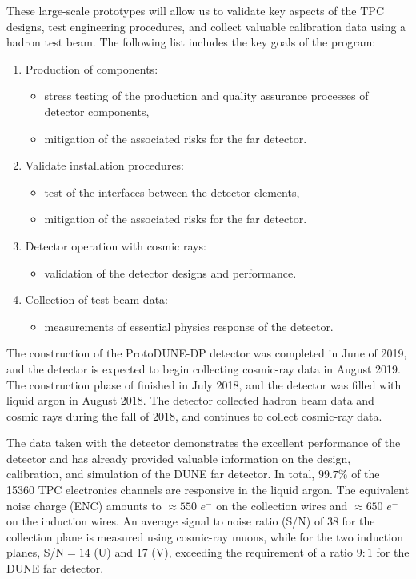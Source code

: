 These large-scale prototypes will allow us to validate key aspects of the TPC designs, test engineering procedures, and collect valuable calibration data using a hadron test beam. The following list includes the key goals of the  program:
\begin{enumerate}
\item Production of components:
\begin{itemize}
\item stress testing of the production and quality
assurance processes of detector components,
\item mitigation of the associated risks for the far detector.
\end{itemize}
\item Validate installation procedures:
\begin{itemize}
\item test of the interfaces between the detector elements,
\item mitigation of the associated risks for the far detector.
\end{itemize}
\item Detector operation with cosmic rays:
\begin{itemize}
\item validation of the detector designs and
performance.
\end{itemize}
\item Collection of test beam data:
\begin{itemize}
\item measurements of essential physics response of the detector.
\end{itemize}
\end{enumerate}


 The construction of the ProtoDUNE-DP detector was completed in June of 2019, and the detector is expected to begin collecting cosmic-ray data in August 2019. The construction phase of  finished in July 2018, and the detector was filled with liquid argon in August 2018. The detector collected hadron beam data and cosmic rays during the fall of 2018, and continues to collect cosmic-ray data.

The data taken with the  detector demonstrates the excellent performance of the detector and has already provided valuable information on the design, calibration, and simulation of the DUNE far detector. In total, $99.7\%$ of the 15360 TPC electronics channels are responsive in the liquid argon. The equivalent noise charge (ENC) amounts to $\approx 550$ $e^{-}$ on the collection wires and $\approx 650$ $e^{-}$ on the induction wires. An average signal to noise ratio (S/N) of 38 for the collection plane is measured using cosmic-ray muons, while for the two induction planes, S/N$=14$ (U) and 17 (V), exceeding the requirement of a ratio $9:1$ for the DUNE far detector. 

